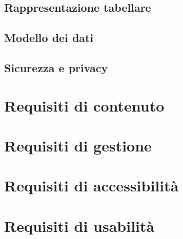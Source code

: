 \subsection{Rappresentazione tabellare}

\subsection{Modello dei dati}

\subsection{Sicurezza e privacy}

\section{Requisiti di contenuto}\label{sec:requisiti-di-contenuto}

\section{Requisiti di gestione}\label{sec:requisiti-di-gestione}

\section{Requisiti di accessibilità}\label{sec:requisiti-di-accessibilita}

\section{Requisiti di usabilità}\label{sec:requisiti-di-usabilita}
